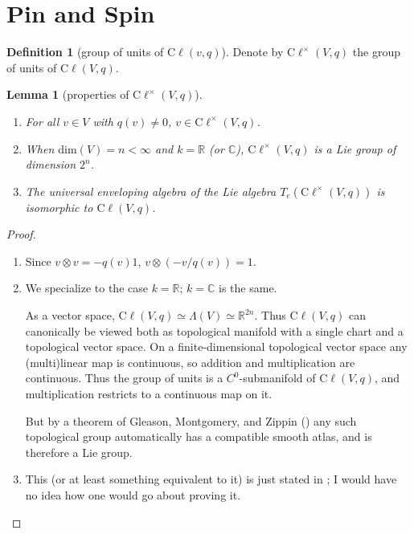 \documentclass[a4paper,10pt]{scrreprt}
\newcommand{\R}{\mathbb{R}}
\newcommand{\C}{\mathbb{C}}
\newcommand{\defn}[1]{\ul{#1}}
\newcommand{\cliff}{\mathrm{C}\ell}
\theoremstyle{definition}
\newtheorem{definition}{Definition}[section]
\theoremstyle{plain}
\newtheorem{lemma}{Lemma}[section]
\theoremstyle{remark}
\begin{document}
\section{Pin and Spin}
\begin{definition}[group of units of $\cliff(v, q)$]
  \label{def:groupofunitsofcliff}
  Denote by \defn{$\cliff^{\times}(V, q)$} the group of units of $\cliff(V, q)$.
\end{definition}
\begin{lemma}[properties of $\cliff^{\times}(V, q)$]
  $\,$
  \begin{enumerate}
    \item For all $v \in V$ with $q(v) \neq 0$, $v \in \cliff^{\times}(V, q)$.

    \item When $\mathrm{dim}(V) = n < \infty$ and $k = \R$ (or $\C$), $\cliff^{\times}(V, q)$ is a Lie group of dimension $2^{n}$.

    \item The universal enveloping algebra of the Lie algebra $T_{e}(\cliff^{\times}(V, q))$ is isomorphic to $\cliff(V, q)$.
  \end{enumerate}
\end{lemma}
\begin{proof}
  $\,$
  \begin{enumerate}
    \item Since $v \otimes v = -q(v)1$, $v \otimes \left( -v/q(v) \right) = 1$.

    \item We specialize to the case $k = \R$; $k = \C$ is the same. 

      As a vector space, $\cliff(V, q) \simeq \Lambda(V) \simeq \R^{2n}$. Thus $\cliff(V, q)$ can canonically be viewed both as topological manifold with a single chart and a topological vector space. On a finite-dimensional topological vector space any (multi)linear map is continuous, so addition and multiplication are continuous. Thus the group of units is a $C^{0}$-submanifold of $\cliff(V, q)$, and multiplication restricts to a continuous map on it. 

      But by a theorem of Gleason, Montgomery, and Zippin (\cite{gleason-montgomery-zippin}) any such topological group automatically has a compatible smooth atlas, and is therefore a Lie group.

    \item This (or at least something equivalent to it) is just stated in \cite{michelson-lawson}; I would have no idea how one would go about proving it.
  \end{enumerate}
\end{proof}
\end{document}
